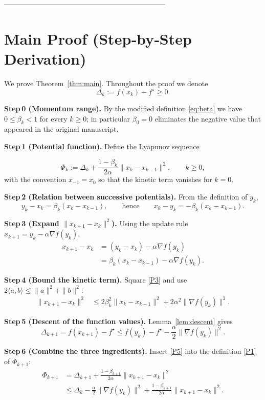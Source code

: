 \documentclass[11pt]{article}
\begin{document}
--------------------------------------------------------------------

\section*{Main Proof (Step‑by‑Step Derivation)}
We prove Theorem~\ref{thm:main}.  Throughout the proof we denote
\[
\Delta_k:=f(x_k)-f^\star\ge0.
\]

\noindent\textbf{Step 0 (Momentum range).}  
By the modified definition \eqref{eq:beta} we have $0\le\beta_k<1$ for every $k\ge0$; in particular $\beta_0=0$ eliminates the negative value that appeared in the original manuscript.

\noindent\textbf{Step 1 (Potential function).}  
Define the Lyapunov sequence  

\[
\Phi_k:=\Delta_k+\frac{1-\beta_k}{2\alpha}\|x_k-x_{k-1}\|^{2},
\qquad k\ge0,
\tag{P1}
\]
with the convention $x_{-1}=x_0$ so that the kinetic term vanishes for $k=0$.

\noindent\textbf{Step 2 (Relation between successive potentials).}  
From the definition of $y_k$,
\[
y_k-x_k=\beta_k (x_k-x_{k-1}),
\qquad\text{hence}\qquad
x_k-y_k=-\beta_k (x_k-x_{k-1}). \tag{P2}
\]

\noindent\textbf{Step 3 (Expand $\|x_{k+1}-x_k\|^{2}$).}  
Using the update rule $x_{k+1}=y_k-\alpha\nabla f(y_k)$,
\[
\begin{aligned}
x_{k+1}-x_k
&= (y_k-x_k)-\alpha\nabla f(y_k)\\
&= \beta_k (x_k-x_{k-1})-\alpha\nabla f(y_k). \tag{P3}
\end{aligned}
\]

\noindent\textbf{Step 4 (Bound the kinetic term).}  
Square \eqref{P3} and use $2\langle a,b\rangle\le\|a\|^{2}+\|b\|^{2}$:
\[
\begin{aligned}
\|x_{k+1}-x_k\|^{2}
&\le 2\beta_k^{2}\|x_k-x_{k-1}\|^{2}
   +2\alpha^{2}\|\nabla f(y_k)\|^{2}. \tag{P4}
\end{aligned}
\]

\noindent\textbf{Step 5 (Descent of the function values).}  
Lemma~\ref{lem:descent} gives
\[
\Delta_{k+1}=f(x_{k+1})-f^\star
\le f(y_k)-f^\star-\frac{\alpha}{2}\|\nabla f(y_k)\|^{2}.
\tag{P5}
\]

\noindent\textbf{Step 6 (Combine the three ingredients).}  
Insert \eqref{P5} into the definition \eqref{P1} of $\Phi_{k+1}$:
\[
\begin{aligned}
\Phi_{k+1}
&= \Delta_{k+1}
   +\frac{1-\beta_{k+1}}{2\alpha}\|x_{k+1}-x_k\|^{2}\\
&\le \Delta_k-\frac{\alpha}{2}\|\nabla f(y_k)\|^{2}
   +\frac{1-\beta_{k+1}}{2\alpha}\|x_{k+1}-x_k\|^{2}.
\end{aligned}
\tag{P6}
\]
\end{document}
